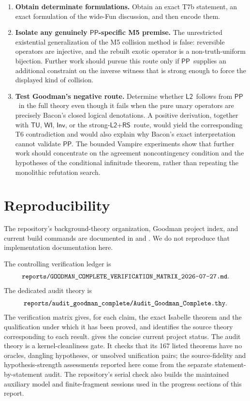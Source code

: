 \documentclass[12pt,leqno]{article}
\theoremstyle{plain}
\theoremstyle{definition}
\newcommand{\isa}[1]{\texttt{\detokenize{#1}}}
\newcommand{\PP}{\ensuremath{\mathsf{PP}}}
\newcommand{\Ltwo}{\ensuremath{\mathsf{L2}}}
\newcommand{\TU}{\ensuremath{\mathsf{TU}}}
\newcommand{\WI}{\ensuremath{\mathsf{WI}}}
\newcommand{\Inv}{\ensuremath{\mathsf{Inv}}}
\newcommand{\RS}{\ensuremath{\mathsf{RS}}}
\begin{document}
\begin{enumerate}
      whether that principle follows from the stated stock or whether the
      construction can be replaced by one requiring only the stated
      principles.
\item \textbf{Obtain determinate formulations.}
      Obtain an exact T7b statement, an exact formulation of the wide-Fun
      discussion, and then encode them.
\item \textbf{Isolate any genuinely \PP-specific M5 premise.}
      The unrestricted existential generalization of the M5 collision method
      is false: reversible operators are injective, and the rebuilt exotic
      operator is a non-truth-uniform bijection.  Further work should pursue
      this route only if \PP\ supplies an additional constraint on the
      inverse witness that is strong enough to force the displayed kind of
      collision.
\item \textbf{Test Goodman's negative route.}
      Determine whether \Ltwo\ follows from \PP\ in the full theory even
      though it fails when the pure unary operators are precisely Bacon's
      closed logical denotations.  A positive
      derivation, together
      with \TU, \WI, \Inv, or the strong-\Ltwo+\RS\ route, would yield the
      corresponding T6 contradiction and would also explain why Bacon's exact
      interpretation cannot validate \PP.  The bounded Vampire experiments show
      that further work should concentrate on the agreement noncontingency
      condition and the hypotheses of the conditional infinitude theorem,
      rather than repeating the monolithic refutation search.
\end{enumerate}

\section{Reproducibility}

The repository's background-theory organization, Goodman project index, and
current build commands are documented in \isa{README.md} and
\isa{docs/REPOSITORY_STRUCTURE.md}.  We do not reproduce that implementation
documentation here.

The controlling verification ledger is
\[
\isa{reports/GOODMAN_COMPLETE_VERIFICATION_MATRIX_2026-07-27.md}.
\]
The dedicated audit theory is
\[
\isa{reports/audit_goodman_complete/Audit_Goodman_Complete.thy}.
\]
The verification matrix gives, for each claim, the exact Isabelle theorem and
the qualification under which it has been proved, and identifies the source
theory corresponding to each result.  \isa{STATUS.md} gives the concise
current project status.
The audit theory is a kernel-cleanliness gate.  It checks that its 167 listed
theorems have no oracles, dangling hypotheses, or unsolved unification pairs;
the source-fidelity and hypothesis-strength assessments reported here come
from the separate statement-by-statement audit.  The repository's serial
check also builds the maintained auxiliary model and finite-fragment sessions
used in the progress sections of this report.
\end{document}
